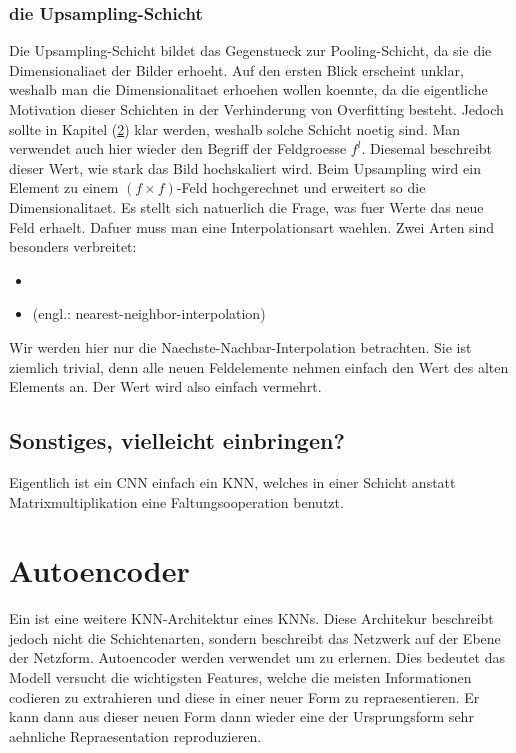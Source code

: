 \subsection{die Upsampling-Schicht}
Die Upsampling-Schicht bildet das Gegenstueck zur Pooling-Schicht, da sie die
Dimensionaliaet der Bilder erhoeht. Auf den ersten Blick erscheint unklar,
weshalb man die Dimensionalitaet erhoehen wollen koennte, da die eigentliche
Motivation dieser Schichten in der Verhinderung von Overfitting besteht. Jedoch
sollte in Kapitel (\ref{sec:autoencoder}) klar werden, weshalb solche Schicht
noetig sind.
\para{}
Man verwendet auch hier wieder den Begriff der Feldgroesse $f^l$. Diesemal
beschreibt dieser Wert, wie stark das Bild hochskaliert wird. Beim Upsampling
wird ein Element zu einem $(f \times f)$-Feld hochgerechnet und erweitert so die
Dimensionalitaet.
\para{}
Es stellt sich natuerlich die Frage, was fuer Werte das neue Feld erhaelt.
Dafuer muss man eine Interpolationsart waehlen.
Zwei Arten sind besonders verbreitet:
\begin{itemize}
\item{}
\item{ (engl.: nearest-neighbor-interpolation)}
\end{itemize}
Wir werden hier nur die Naechste-Nachbar-Interpolation betrachten. Sie ist
ziemlich trivial, denn alle neuen Feldelemente nehmen einfach den Wert des alten
Elements an. Der Wert wird also einfach vermehrt.

\section{Sonstiges, vielleicht einbringen?}
Eigentlich ist ein CNN einfach ein KNN, welches in einer Schicht anstatt
Matrixmultiplikation eine Faltungsooperation benutzt.

\pagebreak
\chapter{Autoencoder}\label{sec:autoencoder}
Ein  ist eine weitere KNN-Architektur eines KNNs. Diese
Architekur beschreibt jedoch nicht die Schichtenarten, sondern beschreibt das
Netzwerk auf der Ebene der Netzform. Autoencoder werden verwendet um  zu erlernen. Dies bedeutet das Modell versucht die
wichtigsten Features, welche die meisten Informationen codieren zu extrahieren
und diese in einer neuer Form zu repraesentieren. Er kann dann aus dieser neuen
Form dann wieder eine der Ursprungsform sehr aehnliche Repraesentation reproduzieren.
\para{}

